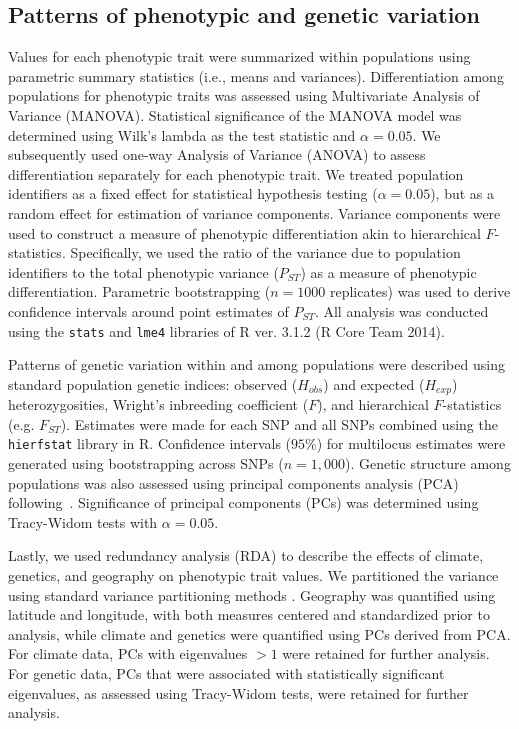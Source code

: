 \documentclass[smallextended]{svjour3}
\begin{document}
\subsection*{Patterns of phenotypic and genetic variation}

Values for each phenotypic trait were summarized  within populations using
parametric summary statistics (i.e., means and variances). Differentiation among
populations for phenotypic traits was assessed using Multivariate Analysis of
Variance (MANOVA). Statistical significance of the MANOVA model was determined
using Wilk's lambda as the test statistic and $\alpha = 0.05$. We subsequently
used one-way Analysis of Variance (ANOVA) to assess differentiation separately
for each phenotypic trait. We treated population identifiers as a fixed effect
for statistical hypothesis testing ($\alpha = 0.05$), but as a random effect for
estimation of variance components. Variance components were used to construct a
measure of phenotypic differentiation akin to hierarchical $F$-statistics.
Specifically, we used the ratio of the variance due to population identifiers to
the total phenotypic variance ($P_{ST}$) as a measure of phenotypic
differentiation. Parametric bootstrapping ($n = 1000$ replicates) was used
to derive confidence intervals around point estimates of $P_{ST}$. All analysis
was conducted using the \texttt{stats} and
\texttt{lme4} libraries of R ver. 3.1.2 (R Core Team 2014).

Patterns of genetic variation within and among populations were described using
standard population genetic indices: observed ($H_{obs}$) and expected
($H_{exp}$) heterozygosities, Wright's inbreeding coefficient ($F$), and
hierarchical $F$-statistics (e.g. $F_{ST}$). Estimates were made for each SNP
and all SNPs combined using the \texttt{hierfstat} library in R. Confidence
intervals ($95\%$) for multilocus estimates were generated using bootstrapping
across SNPs ($n = 1,000$). Genetic structure among populations was also assessed
using principal components analysis (PCA) following~\cite{Patterson:2006}.
Significance of principal components (PCs) was determined using Tracy-Widom
tests with $\alpha = 0.05$.

Lastly, we used redundancy analysis (RDA) to describe the effects of climate,
genetics, and geography on phenotypic trait values. We partitioned the variance
using standard variance partitioning methods \citep{Borcard:1992, Liu:1997}.
Geography was quantified using latitude and longitude, with both measures
centered and standardized prior to analysis, while climate and genetics were
quantified using PCs derived from PCA. For climate data, PCs with eigenvalues
$> 1$ were retained for further analysis. For genetic data, PCs that were
associated with statistically significant eigenvalues, as assessed using
Tracy-Widom tests, were retained for further analysis.
\end{document}
